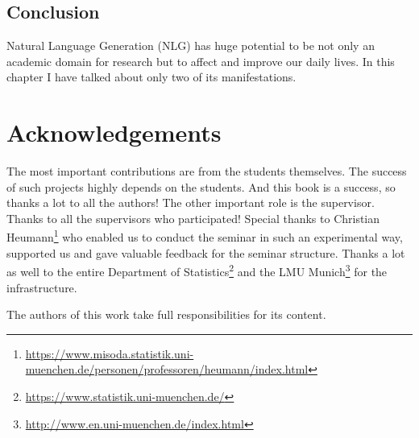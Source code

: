 \documentclass[]{krantz}
\renewcommand{\href}[2]{#2\footnote{\url{#1}}}
\begin{document}
\hypertarget{conclusion}{%
\section{Conclusion}\label{conclusion}}

Natural Language Generation (NLG) has huge potential to be not only an academic domain for research but to affect and improve our daily lives. In this chapter I have talked about only two of its manifestations.

\hypertarget{acknowledgements}{%
\chapter{Acknowledgements}\label{acknowledgements}}

The most important contributions are from the students themselves.
The success of such projects highly depends on the students.
And this book is a success, so thanks a lot to all the authors!
The other important role is the supervisor.
Thanks to all the supervisors who participated!
Special thanks to \href{https://www.misoda.statistik.uni-muenchen.de/personen/professoren/heumann/index.html}{Christian Heumann} who enabled us to conduct the seminar in such an experimental way, supported us and gave valuable feedback for the seminar structure.
Thanks a lot as well to the entire \href{https://www.statistik.uni-muenchen.de/}{Department of Statistics} and the \href{http://www.en.uni-muenchen.de/index.html}{LMU Munich} for the infrastructure.

The authors of this work take full responsibilities for its content.



\backmatter
\printindex
\end{document}
